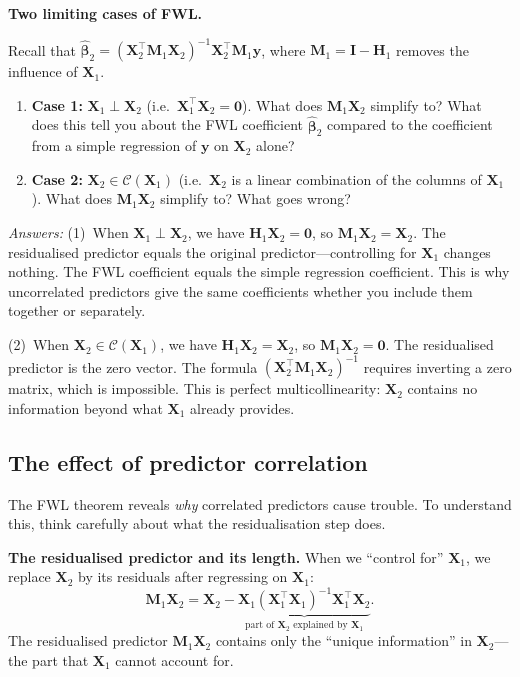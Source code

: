 \documentclass[11pt,a4paper]{article}
\theoremstyle{plain}
\theoremstyle{definition}
\newcommand{\bhat}{\hat{\bm{\beta}}}
\newcommand{\bX}{\bm{X}}
\newcommand{\by}{\bm{y}}
\newcommand{\bH}{\bm{H}}
\newcommand{\bM}{\bm{M}}
\newcommand{\bI}{\bm{I}}
\newcommand{\Col}{\mathcal{C}}
\begin{document}
\begin{stopandthink}
\textbf{Two limiting cases of FWL.}

Recall that $\bhat_2 = (\bX_2^\top \bM_1 \bX_2)^{-1}\bX_2^\top \bM_1 \by$,
where $\bM_1 = \bI - \bH_1$ removes the influence of $\bX_1$.
\begin{enumerate}[nosep]
  \item \textbf{Case 1:} $\bX_1 \perp \bX_2$
    (i.e.\ $\bX_1^\top \bX_2 = \bm{0}$).
    What does $\bM_1 \bX_2$ simplify to?
    What does this tell you about the FWL coefficient $\bhat_2$
    compared to the coefficient from a simple regression of $\by$ on $\bX_2$ alone?
  \item \textbf{Case 2:} $\bX_2 \in \Col(\bX_1)$
    (i.e.\ $\bX_2$ is a linear combination of the columns of $\bX_1$).
    What does $\bM_1 \bX_2$ simplify to?
    What goes wrong?
\end{enumerate}
\emph{Answers:}
(1)~When $\bX_1 \perp \bX_2$, we have $\bH_1 \bX_2 = \bm{0}$, so
$\bM_1 \bX_2 = \bX_2$. The residualised predictor equals the original
predictor---controlling for $\bX_1$ changes nothing.
The FWL coefficient equals the simple regression coefficient.
This is why uncorrelated predictors give the same coefficients whether
you include them together or separately.

(2)~When $\bX_2 \in \Col(\bX_1)$, we have $\bH_1 \bX_2 = \bX_2$, so
$\bM_1 \bX_2 = \bm{0}$. The residualised predictor is the zero vector.
The formula $(\bX_2^\top \bM_1 \bX_2)^{-1}$ requires inverting a zero matrix,
which is impossible.
This is perfect multicollinearity: $\bX_2$ contains no information
beyond what $\bX_1$ already provides.
\end{stopandthink}

\subsection{The effect of predictor correlation}

The FWL theorem reveals \emph{why} correlated predictors cause trouble.
To understand this, think carefully about what the residualisation step does.

\medskip
\noindent\textbf{The residualised predictor and its length.}
When we ``control for'' $\bX_1$, we replace $\bX_2$ by its residuals after regressing on $\bX_1$:
\[
  \bM_1\bX_2 = \bX_2 - \underbrace{\bX_1(\bX_1^\top\bX_1)^{-1}\bX_1^\top\bX_2}_{\text{part of }\bX_2\text{ explained by }\bX_1}.
\]
The residualised predictor $\bM_1\bX_2$ contains only the ``unique information'' in $\bX_2$---the part that $\bX_1$ cannot account for.
\end{document}
